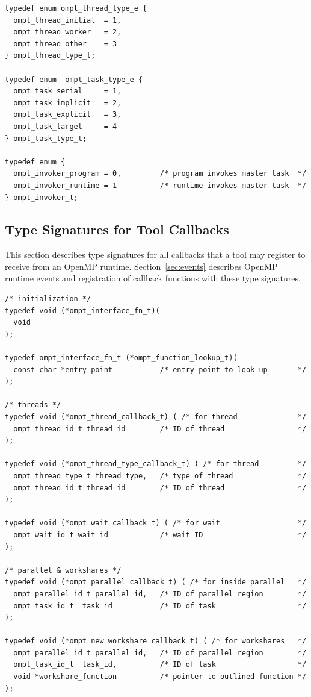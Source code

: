 \documentclass{article}
\begin{document}
{\begin{verbatim}
typedef enum ompt_thread_type_e {
  ompt_thread_initial  = 1,
  ompt_thread_worker   = 2,
  ompt_thread_other    = 3
} ompt_thread_type_t;

typedef enum  ompt_task_type_e {
  ompt_task_serial     = 1,
  ompt_task_implicit   = 2,
  ompt_task_explicit   = 3,
  ompt_task_target     = 4
} ompt_task_type_t;

typedef enum {
  ompt_invoker_program = 0,         /* program invokes master task  */
  ompt_invoker_runtime = 1          /* runtime invokes master task  */
} ompt_invoker_t;
\end{verbatim}

\clearpage  
\subsection{Type Signatures for Tool Callbacks}
\label{appendix:ompt-types:callbacks}
This section describes type signatures for all  callbacks that a tool may register to receive from an OpenMP runtime. Section~\ref{sec:events} describes OpenMP runtime events and registration of
callback functions with these type signatures.

\begin{verbatim}
/* initialization */
typedef void (*ompt_interface_fn_t)(
  void
);

typedef ompt_interface_fn_t (*ompt_function_lookup_t)(
  const char *entry_point           /* entry point to look up       */
);

/* threads */	
typedef void (*ompt_thread_callback_t) ( /* for thread              */	   
  ompt_thread_id_t thread_id        /* ID of thread                 */
);

typedef void (*ompt_thread_type_callback_t) ( /* for thread         */
  ompt_thread_type_t thread_type,   /* type of thread               */	   
  ompt_thread_id_t thread_id        /* ID of thread                 */
);
	
typedef void (*ompt_wait_callback_t) ( /* for wait                  */
  ompt_wait_id_t wait_id            /* wait ID                      */
);
	
/* parallel & workshares */
typedef void (*ompt_parallel_callback_t) ( /* for inside parallel   */			   
  ompt_parallel_id_t parallel_id,   /* ID of parallel region        */
  ompt_task_id_t  task_id           /* ID of task                   */
);								    

typedef void (*ompt_new_workshare_callback_t) ( /* for workshares   */			   
  ompt_parallel_id_t parallel_id,   /* ID of parallel region        */
  ompt_task_id_t  task_id,          /* ID of task                   */
  void *workshare_function          /* pointer to outlined function */
);								    
							   	    

\end{verbatim}}
\end{document}
